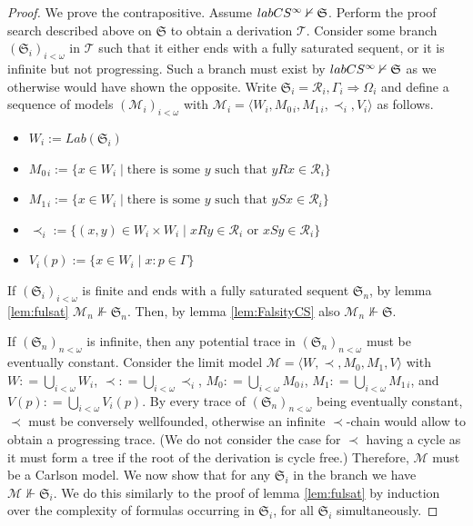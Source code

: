 \documentclass[10pt,a4paper]{amsart}
\newcommand{\Mw}{\mathcal{M}}
\newcommand{\Ra}{\Rightarrow}
\newcommand{\R}{\mathcal{R}}
\newcommand{\Seq}{\mathfrak{S}}
\newcommand{\labCS}{{\textnormal{labCS}^\infty}}
\newcommand{\la}{\langle}
\newcommand{\ra}{\rangle}
\newcommand{\spa}{\;|\;}
\newcommand{\tree}{\mathcal{T}}
\begin{document}
\begin{proof}    
    We prove the contrapositive.
    Assume $\labCS \nvdash \Seq$. Perform the proof search described above on $\Seq$ to obtain a derivation $\tree$. Consider some branch $(\Seq_i)_{i < \omega}$ in $\tree$ such that it either ends with a fully saturated sequent, or it is infinite but not progressing. Such a branch must exist by $\labCS \nvdash \Seq$ as we otherwise would have shown the opposite. 
    Write $\Seq_i = \R_i , \Gamma_i \Ra \Omega_i$ and define a sequence of models $(\Mw_i)_{i < \omega}$ with $\Mw_i = \la W_i , M_{0 \, i}, M_{1 \, i}, \prec_i, V_i \ra$ as follows.
    \begin{itemize}
        \item[] $W_i := Lab(\Seq_i)$
        \item[] $M_{0 \, i} := \{ x \in W_i \spa \text{there is some } y \text{ such that } yRx \in \R_i \}$
        \item[] $M_{1 \, i}:= \{ x \in W_i \spa \text{there is some } y \text{ such that } ySx \in \R_i \}$
        \item[] ${\prec_i} := \{ (x,y) \in W_i \times W_i \spa xRy \in \R_i \text{ or } xSy \in \R_i \}$
        \item[] $V_i(p) := \{ x \in W_i \spa x : p \in \Gamma \}$
    \end{itemize}
    
    If $(\Seq_i)_{i < \omega}$ is finite and ends with a fully saturated sequent $\Seq_n$, by lemma \ref{lem:fulsat} $\Mw_n \nVdash \Seq_n$. Then, by lemma \ref{lem:FalsityCS} also $\Mw_n \nVdash \Seq$.
    
    If $(\Seq_n)_{n < \omega}$ is infinite, then any potential trace in $(\Seq_n)_{n < \omega}$ must be eventually constant. Consider the limit model $\Mw = \la W , \prec , M_0 , M_1 , V \ra$ with $W : =\bigcup_{i < \omega} W_i$, ${\prec} : =\bigcup_{i < \omega} \prec_i$, $M_0 : =\bigcup_{i < \omega} M_{0 \, i}$, $M_1 : =\bigcup_{i < \omega} M_{1 \, i}$, and $V(p) : =\bigcup_{i < \omega} V_i (p)$. 
    By every trace of $(\Seq_n)_{n < \omega}$ being eventually constant, $\prec$ must be conversely wellfounded, otherwise an infinite $\prec$-chain would allow to obtain a progressing trace. (We do not consider the case for $\prec$ having a cycle as it must form a tree if the root of the derivation is cycle free.) Therefore, $\Mw$ must be a Carlson model. We now show that for any $\Seq_i$ in the branch we have $\Mw \nVdash \Seq_i$. We do this similarly to the proof of lemma \ref{lem:fulsat} by induction over the complexity of formulas occurring in $\Seq_i$, for all $\Seq_i$ simultaneously. 
    

\end{proof}
\end{document}
